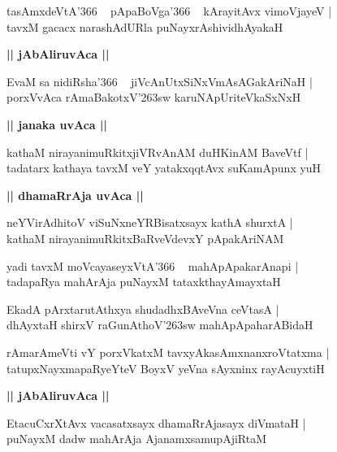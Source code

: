\documentclass[twoside,12pt,openright]{book}
\def\S{\char'263}
\newcounter{shloka}[chapter]
\def\uvaca#1{\centerline{{\large\textbf{#1}}}}
\begin{document}
\begin{shloka}%
tasAmxdeVtA\char'366 ~ pApaBoVga\char'366 ~ kArayitAvx vimoVjayeV |\\
tavxM gacacx narashAdURla puNayxrAshividhAyakaH 
\end{shloka}

\uvaca{|| jAbAliruvAca ||}

\begin{shloka}%
EvaM sa nidiRsha\char'366 ~ jiVcAnUtxSiNxVmAsAGakAriNaH |\\
porxVvAca rAmaBakotxV\S sw karuNApUriteVkaSxNxH 
\end{shloka}

\uvaca{|| janaka uvAca ||}

\begin{shloka}%
kathaM nirayanimuRkitxjiVRvAnAM duHKinAM BaveVtf |\\
tadatarx kathaya tavxM veY yatakxqqtAvx suKamApunx yuH 
\end{shloka}

\uvaca{|| dhamaRrAja uvAca ||}

\begin{shloka}%
neYVirAdhitoV viSuNxneYRBisatxsayx kathA shurxtA |\\
kathaM nirayanimuRkitxBaRveVdevxY pApakAriNAM 
\end{shloka}

\begin{shloka}%
yadi tavxM moVcayaseyxVtA\char'366 ~ mahApApakarAnapi |\\
tadapaRya mahArAja puNayxM tataxkthayAmayxtaH 
\end{shloka}

\begin{shloka}%
EkadA pArxtarutAthxya shudadhxBAveVna ceVtasA |\\
dhAyxtaH shirxV raGunAthoV\S sw mahApApaharABidaH 
\end{shloka}

\begin{shloka}%
rAmarAmeVti vY porxVkatxM tavxyAkasAmxnanxroVtatxma |\\
tatupxNayxmapaRyeYteV BoyxV yeVna sAyxninx rayAcuyxtiH 
\end{shloka}

\uvaca{|| jAbAliruvAca ||}

\begin{shloka}%
EtacuCxrXtAvx vacasatxsayx dhamaRrAjasayx diVmataH |\\
puNayxM dadw mahArAja AjanamxsamupAjiRtaM 
\end{shloka}
\end{document}
